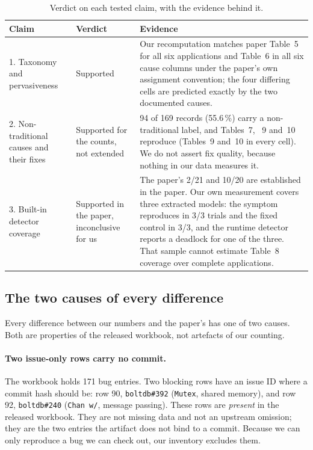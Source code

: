 \documentclass[11pt]{article}
\begin{document}
\begin{table}[h]
\centering
\caption{Verdict on each tested claim, with the evidence behind it.}
\label{tab:verdicts}
\begin{tabular}{@{}p{}p{}p{}@{}}
\toprule
Claim & Verdict & Evidence \\
\midrule
1. Taxonomy and pervasiveness &
Supported &
Our recomputation matches paper Table~5 for all six applications and
Table~6 in all six cause columns under the paper's own assignment
convention; the four differing cells are predicted exactly by the two
documented causes. \\
2. Non-traditional causes and their fixes &
Supported for the counts, not extended &
94 of 169 records (55.6\,\%) carry a non-traditional label, and Tables~7,
~9 and~10 reproduce (Tables~9 and~10 in every cell). We do not assert fix
quality, because nothing in our data measures it. \\
3. Built-in detector coverage &
Supported in the paper, inconclusive for us &
The paper's 2/21 and 10/20 are established in the paper. Our own
measurement covers three extracted models: the symptom reproduces in 3/3
trials and the fixed control in 3/3, and the runtime detector reports a
deadlock for one of the three. That sample cannot estimate Table~8 coverage
over complete applications. \\
\bottomrule
\end{tabular}
\end{table}

\subsection{The two causes of every difference}

Every difference between our numbers and the paper's has one of two causes.
Both are properties of the released workbook, not artefacts of our counting.

\paragraph{Two issue-only rows carry no commit.} The workbook holds 171 bug
entries. Two blocking rows have an issue ID where a commit hash should be:
row 90, \texttt{boltdb\#392} (\texttt{Mutex}, shared memory), and row 92,
\texttt{boltdb\#240} (\texttt{Chan w/}, message passing). These rows are
\emph{present} in the released workbook. They are not missing data and not an
upstream omission; they are the two entries the artifact does not bind to a
commit. Because we can only reproduce a bug we can check out, our inventory
excludes them.
\end{document}
